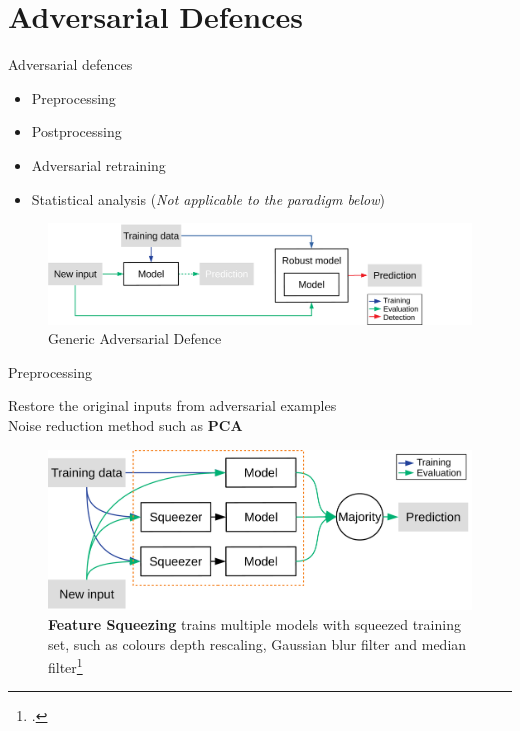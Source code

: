 \documentclass[9pt]{beamer}
\begin{document}
\section{Adversarial Defences}

\begin{frame}{Adversarial defences}
\label{defence}

\begin{itemize}
    \item Preprocessing
    \item Postprocessing
    \item Adversarial retraining
    \item Statistical analysis (\textit{Not applicable to the paradigm below})
\end{itemize}

\begin{figure}
    \centering
    \small
    \includegraphics[width=\linewidth]{images/generic-defence.pdf}
    \caption{Generic Adversarial Defence}
    \label{fig:defence}
\end{figure}

\hyperlink{blackbox_defence}{}
\end{frame}

\begin{frame}{Preprocessing}
\label{preprocessing}

Restore the original inputs from adversarial examples\\
Noise reduction method such as \textbf{PCA}
\begin{examples}
    \begin{figure}
        \centering
        \small
        \includegraphics[width=0.8\linewidth]{images/feature_squeeze.pdf}
        \caption{\textbf{Feature Squeezing} trains multiple models with squeezed training set, such as colours depth rescaling, Gaussian blur filter and median filter\footcite{xu2017feature}}
    \end{figure}
\end{examples}

\hyperlink{adv_examples}{}
\end{frame}
\end{document}
